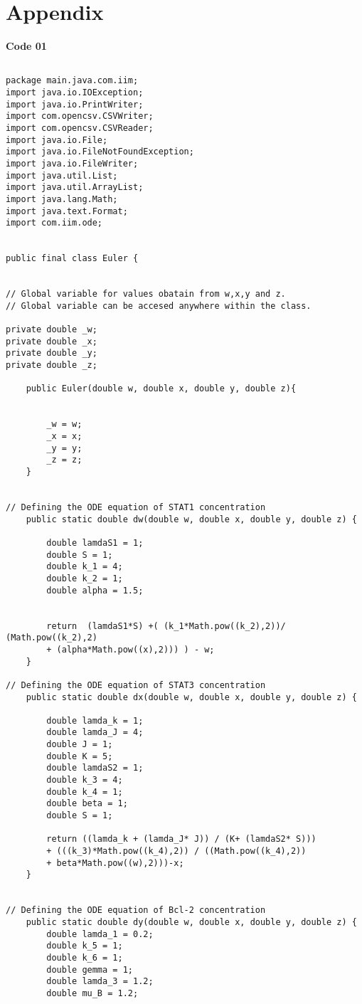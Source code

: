 \chapter*{Appendix}


\textbf{\Large Code 01}\\

\begin{framed}
\begin{verbatim}

package main.java.com.iim;
import java.io.IOException;
import java.io.PrintWriter;
import com.opencsv.CSVWriter;
import com.opencsv.CSVReader;
import java.io.File;
import java.io.FileNotFoundException;
import java.io.FileWriter;
import java.util.List;
import java.util.ArrayList;
import java.lang.Math;
import java.text.Format;
import com.iim.ode;


public final class Euler {
 

// Global variable for values obatain from w,x,y and z. 
// Global variable can be accesed anywhere within the class. 

private double _w;
private double _x;
private double _y;
private double _z;

    public Euler(double w, double x, double y, double z){


        _w = w;
        _x = x;
        _y = y;
        _z = z;
    }


// Defining the ODE equation of STAT1 concentration 
    public static double dw(double w, double x, double y, double z) {

        double lamdaS1 = 1;
        double S = 1;
        double k_1 = 4;
        double k_2 = 1;
        double alpha = 1.5;


        return  (lamdaS1*S) +( (k_1*Math.pow((k_2),2))/ (Math.pow((k_2),2) 
        + (alpha*Math.pow((x),2))) ) - w;
    }

// Defining the ODE equation of STAT3 concentration     
    public static double dx(double w, double x, double y, double z) {

        double lamda_k = 1;
        double lamda_J = 4;
        double J = 1;
        double K = 5;
        double lamdaS2 = 1;
        double k_3 = 4;
        double k_4 = 1;
        double beta = 1;
        double S = 1;

        return ((lamda_k + (lamda_J* J)) / (K+ (lamdaS2* S))) 
        + (((k_3)*Math.pow((k_4),2)) / ((Math.pow((k_4),2))
        + beta*Math.pow((w),2)))-x;
    }


// Defining the ODE equation of Bcl-2 concentration  
    public static double dy(double w, double x, double y, double z) {
        double lamda_1 = 0.2;
        double k_5 = 1;
        double k_6 = 1;
        double gemma = 1;
        double lamda_3 = 1.2;
        double mu_B = 1.2;


\end{verbatim}
\end{framed}
